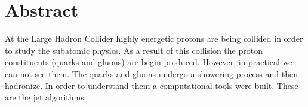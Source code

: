 
\chapter*{Abstract} 
At the Large Hadron Collider highly energetic protons are being collided in order to study the subatomic physics. As a result of this collision the proton constituents (quarks and gluons) are begin produced.
However, in practical we can not see them.
The quarks and gluons undergo a showering process and then hadronize.
In order to understand them a computational tools were built. These are the jet algorithms.

%
%
%
%




